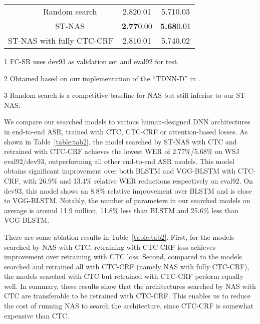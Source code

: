\documentclass{article}
\newcommand{\tabref}{Table~\ref}
\begin{document}
\begin{table}[t]
{\begin{threeparttable}
\begin{tabular}{cccc}
                ~                                                            & Random search\tnote{3}                 & 2.820.01       & 5.710.03       \\
                ~                                                            & ST-NAS                                 & {\bf 2.77}0.00 & {\bf 5.68}0.01 \\
                \midrule
                \multicolumn{2}{c}{ST-NAS with fully CTC-CRF}                & 2.810.01                          & 5.740.02                             \\
                \bottomrule
            \end{tabular}
            \begin{tablenotes}
                \footnotesize
                \item[1] FC-SR uses dev93 as validation set and eval92 for test.
                \item[2] Obtained based on our implementation of the ``TDNN-D'' in \cite{peddinti2018low}.
                \item[3] Random search is a competitive baseline for NAS \cite{Li2019Random} but still inferior to our ST-NAS.
            \end{tablenotes}
        \end{threeparttable}}
\end{table}


We compare our searched models to various human-designed DNN architectures in end-to-end ASR, trained with CTC, CTC-CRF or attention-based losses.
As shown in \tabref{table:tab2}, the model searched by ST-NAS with CTC and retrained with CTC-CRF achieves the lowest WER of 2.77\%/5.68\% on WSJ eval92/dev93, outperforming all other end-to-end ASR models.
This model obtains significant improvement over both BLSTM and VGG-BLSTM with CTC-CRF, with 26.9\% and 13.4\% relative WER reductions respectively on eval92.
On dev93, this model shows an 8.8\% relative improvement over BLSTM and is close to VGG-BLSTM.
Notably, the number of parameters in our searched models on average is around 11.9 million, 11.8\% less than BLSTM and 25.6\% less than VGG-BLSTM.

There are some ablation results in \tabref{table:tab2}.
First, for the models searched by NAS with CTC, retraining with CTC-CRF loss achieves improvement over retraining with CTC loss.
Second, compared to the models searched and retrained all with CTC-CRF (namely NAS with fully CTC-CRF), the models searched with CTC but retrained with CTC-CRF perform equally well.
In summary, these results show that the architectures searched by NAS with CTC are transferable to be retrained with CTC-CRF.
This enables us to reduce the cost of running NAS to search the architecture, since CTC-CRF is somewhat expensive than CTC.
\end{document}
